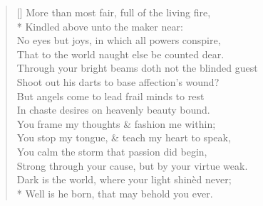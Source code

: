 \documentclass[MAIN]{subfiles}
\begin{document}
\settowidth{\versewidth}{Through your bright beams doth not the blinded guest}
\begin{verse}[\versewidth]
More than most fair, full of the living fire,\\*
\vin Kindled above unto the maker near:\\
No eyes but joys, in which all powers conspire,\\
\vin That to the world naught else be counted dear.\\
Through your bright beams doth not the blinded guest\\
\vin Shoot out his darts to base affection's wound?\\
But angels come to lead frail minds to rest\\
\vin In chaste desires on heavenly beauty bound.\\
You frame my thoughts \& fashion me within;\\
\vin You stop my tongue, \& teach my heart to speak,\\
You calm the storm that passion did begin,\\
\vin Strong through your cause, but by your virtue weak.\\ 
Dark is the world, where your light shin\`ed never;\\*
Well is he born, that may behold you ever.
\end{verse}
\end{document}
